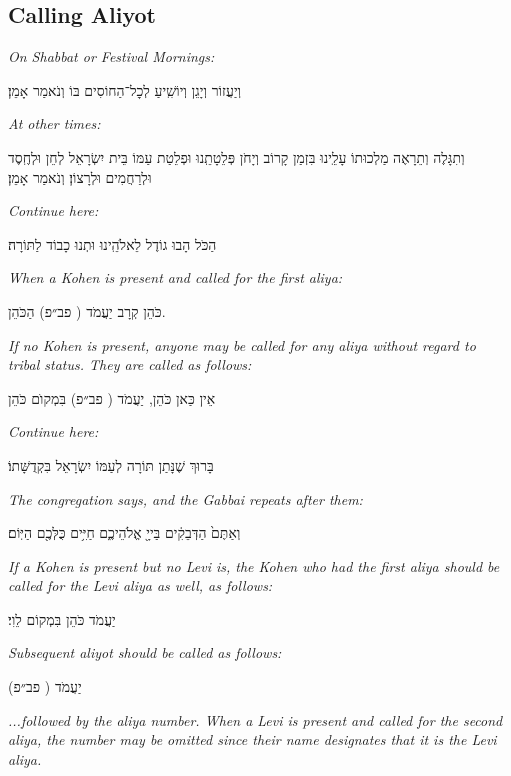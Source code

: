 \documentclass[11pt, openany]{article}
\newcommand{\englishinst}[1]{
	\begin{minipage}{\textwidth}
		\begin{english}\raggedright\centering
			\textit{#1}
				
				\vspace{2pt}
		\end{english}
	\end{minipage}
}
\newcommand{\rashi}[1]{%
		\textsf{#1}}
\newcommand{\eng}[1]{\begin{english}\beginL #1 \endL\end{english}}
\newcommand{\ploni}{(\rashi{פב״פ})
}
\begin{document}
\begin{minipage}{\textwidth}
\eng{\section*{Calling Aliyot}}

\begin{large}\centering
	\englishinst{On Shabbat or Festival Mornings:}
	וְיַעֲזוֹר וְיָגֵן וְיוֹשִֽׁיעַ לְכׇל־הַחוֹסִים בּוֹ וְנֹאמַר אָמֵן׃\\
	
	 \englishinst{At other times:}
	וְתִגָּלֶה וְתֵרָאֶה מַלְכוּתוֹ עָלֵֽינוּ בִּזְמַן קָרוֹב וְיָחֹן פְּלֵטָתֵֽנוּ וּפְלֵטַת עַמּוֹ בֵּית יִשְׂרָאֵל לְחֵן וּלְחֶֽסֶד וּלְרַחֲמִים וּלְרָצוֹן׃ וְנֹאמַר אָמֵן׃\\

\englishinst{Continue here:}
הַכֹּל הָבוּ גוֹדֶל לֵאלֹהֵֽינוּ וּתְנוּ כָבוֹד לַתּוֹרָה׃\\

\vspace{6pt}\englishinst{When a Kohen is present and called for the first aliya:}
 כֹּהֵן קְרָב יַעֲמֹד \ploni הַכֹּהֵן.\\
\vspace{6pt}\englishinst{If no Kohen is present, anyone may be called for any aliya without regard to tribal status. They are called as follows:}
אֵין כַּאן כֹּהֵן, יַעֲמֹד \ploni בִּמְקוׂם כֹּהֵן\\

\vspace{6pt}\englishinst{Continue here:}
בָּרוּךְ שֶׁנָּתַן תּוֹרָה לְעַמּוֹ יִשְׂרָאֵל בִּקְדֻשָּׁתוֹ׃\\

\vspace{6pt}\englishinst{The congregation says, and the Gabbai repeats after them:}
וְאַתֶּם֙ הַדְּבֵקִ֔ים בַּייָ֖ אֱלֹהֵיכֶ֑ם חַיִּ֥ים כֻּלְּכֶ֖ם הַיּֽוֹם׃\\

\vspace{6pt}\englishinst{If a Kohen is present but no Levi is, the Kohen who had the first aliya should be called for the Levi aliya as well, as follows:}
יַעֲמֹד כֹּהֵן בִּמְקוֹם לֵוִי׃\\

\vspace{6pt}\englishinst{Subsequent aliyot should be called as follows:}
יַעֲמֹד \ploni \\
\englishinst{...followed by the aliya number. When a Levi is present and called for the second aliya, the number may be omitted since their name designates that it is the Levi aliya.}
\end{large}\end{minipage}
\end{document}
